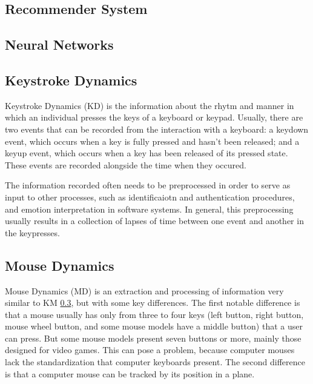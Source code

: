 \documentclass{acm_proc_article-sp}
\begin{document}

\subsection{Recommender System}

\subsection{Neural Networks}


\subsection{Keystroke Dynamics}
\label{KD}

Keystroke Dynamics (KD) is the information about the rhytm and manner
in which an individual presses the keys of a keyboard or
keypad. Usually, there are two events that can be recorded from the
interaction with a keyboard: a keydown event, which occurs when a key
is fully pressed and hasn't been released; and a keyup event, which
occurs when a key has been released of its pressed state. These events
are recorded alongside the time when they occured.

The information recorded often needs to be preprocessed in order to
serve as input to other processes, such as identificaiotn and
authentication procedures, and emotion interpretation in software
systems. In general, this preprocessing usually results in a
collection of lapses of time between one event and another in the
keypresses.


\subsection{Mouse Dynamics}

Mouse Dynamics (MD) is an extraction and processing of information
very similar to KM \ref{KD}, but with some key differences. The first
notable difference is that a mouse usually has only from three to four
keys (left button, right button, mouse wheel button, and some mouse
models have a middle button) that a user can press. But some mouse
models present seven buttons or more, mainly those designed for video
games. This can pose a problem, because computer mouses lack the
standardization that computer keyboards present. The second difference 
is that a computer mouse can be tracked by its position in a plane.
\end{document}
